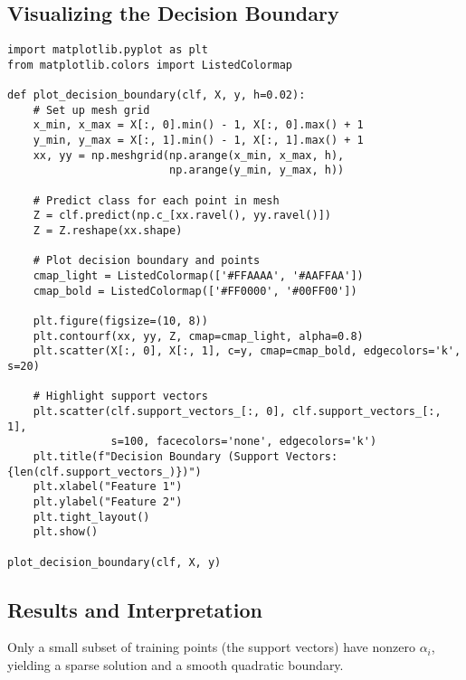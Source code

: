 \documentclass[11pt]{article}
\begin{document}
\subsection{Visualizing the Decision Boundary}
\begin{lstlisting}
import matplotlib.pyplot as plt
from matplotlib.colors import ListedColormap

def plot_decision_boundary(clf, X, y, h=0.02):
    # Set up mesh grid
    x_min, x_max = X[:, 0].min() - 1, X[:, 0].max() + 1
    y_min, y_max = X[:, 1].min() - 1, X[:, 1].max() + 1
    xx, yy = np.meshgrid(np.arange(x_min, x_max, h),
                         np.arange(y_min, y_max, h))
    
    # Predict class for each point in mesh
    Z = clf.predict(np.c_[xx.ravel(), yy.ravel()])
    Z = Z.reshape(xx.shape)
    
    # Plot decision boundary and points
    cmap_light = ListedColormap(['#FFAAAA', '#AAFFAA'])
    cmap_bold = ListedColormap(['#FF0000', '#00FF00'])
    
    plt.figure(figsize=(10, 8))
    plt.contourf(xx, yy, Z, cmap=cmap_light, alpha=0.8)
    plt.scatter(X[:, 0], X[:, 1], c=y, cmap=cmap_bold, edgecolors='k', s=20)
    
    # Highlight support vectors
    plt.scatter(clf.support_vectors_[:, 0], clf.support_vectors_[:, 1],
                s=100, facecolors='none', edgecolors='k')
    plt.title(f"Decision Boundary (Support Vectors: {len(clf.support_vectors_)})")
    plt.xlabel("Feature 1")
    plt.ylabel("Feature 2")
    plt.tight_layout()
    plt.show()

plot_decision_boundary(clf, X, y)
\end{lstlisting}

\subsection{Results and Interpretation}
Only a small subset of training points (the support vectors) have nonzero $\alpha_i$, yielding a sparse solution and a smooth quadratic boundary.
\end{document}
